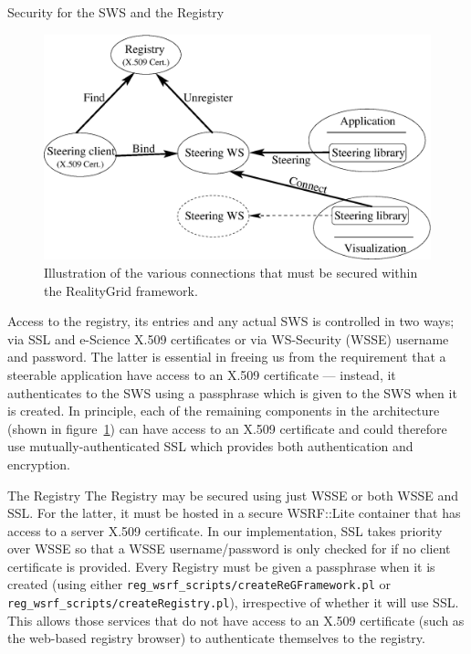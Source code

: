 \documentclass[a4paper]{article}
\begin{document}
\begin{section}{Security for the SWS and the Registry}
\label{sec:security}

\begin{figure}
\begin{center}
\includegraphics[width=14.0cm]{steer_ws_security.eps}
\end{center}
\caption{Illustration of the various connections that must be secured
within the RealityGrid framework.}
\label{fig:arch}
\end{figure}
Access to the registry, its entries and any actual SWS is controlled in
two ways; via SSL and e-Science X.509 certificates or via WS-Security
(WSSE) username and password.  The latter is essential in freeing us from
the requirement that a steerable application have access to an X.509 
certificate --- instead, it authenticates to the SWS using a passphrase
which is given to the SWS when it is created. In principle, each of
the remaining components in the architecture (shown in figure~\ref{fig:arch})
can have access to an
X.509 certificate and could therefore use mutually-authenticated SSL
which provides both authentication and encryption.

\begin{subsection}{The Registry}
The Registry may be secured using just WSSE or both WSSE and SSL.  For the
latter, it must be hosted in a secure WSRF::Lite container that has access to
a server X.509 certificate.  In our implementation, SSL takes priority over
WSSE so that a WSSE username/password is only checked for if no client
certificate is provided.  Every Registry must be given a passphrase when
it is created (using either \texttt{reg\_wsrf\_scripts/createReGFramework.pl}
or \texttt{reg\_wsrf\_scripts/createRegistry.pl}), irrespective of whether 
it will use SSL.  This allows those
services that do not have access to an X.509 certificate (such as the web-based
registry browser) to authenticate
themselves to the registry.
\end{subsection}


\end{section}
\end{document}
